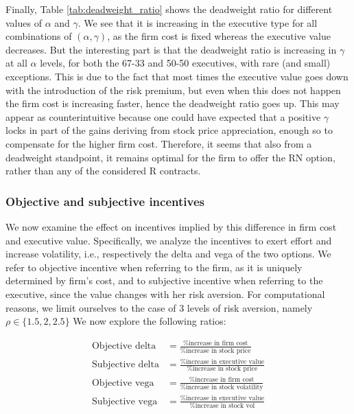 Finally, Table \ref*{tab:deadweight_ratio} shows the deadweight ratio for different values of $\alpha$ and $\gamma$. We see that it is increasing in the executive type for all combinations of $(\alpha, \gamma)$, as the firm cost is fixed whereas the executive value decreases. But the interesting part is that the deadweight ratio is increasing in $\gamma$ at all $\alpha$ levels, for both the 67-33 and 50-50 executives, with rare (and small) exceptions. This is due to the fact that most times the executive value goes down with the introduction of the risk premium, but even when this does not happen the firm cost is increasing faster, hence the deadweight ratio goes up. This may appear as counterintuitive because one could have expected that a positive $\gamma$ locks in part of the gains deriving from stock price appreciation, enough so to compensate for the higher firm cost. 
Therefore, it seems that also from a deadweight standpoint, it remains optimal for the firm to offer the RN option, rather than any of the considered R contracts. 
\newpage



\subsubsection{Objective and subjective incentives}
We now examine the effect on incentives implied by this difference in firm cost and executive value. Specifically, we analyze the incentives to exert effort and increase volatility, i.e., respectively the delta and vega of the two options. We refer to objective incentive when referring to the firm, as it is uniquely determined by firm's cost, and to subjective incentive when referring to the executive, since the value changes with her risk aversion. For computational reasons, we limit ourselves to the case of 3 levels of risk aversion, namely $\rho \in \{1.5, 2, 2.5\}$ We now explore the following ratios: 

\vspace{-2em}

\begin{align*}
\text{Objective delta} &= \frac{\text{\% increase in firm cost}}{\text{\% increase in stock price}} \\[1em]
\text{Subjective delta} &= \frac{\text{\% increase in executive value}}{\text{\% increase in stock price}} \\[1em]
\text{Objective vega} &= \frac{\text{\% increase in firm cost}}{\text{\% increase in stock volatility}} \\[1em]
\text{Subjective vega} &= \frac{\text{\% increase in executive value}}{\text{\% increase in stock vol}}
\end{align*}

